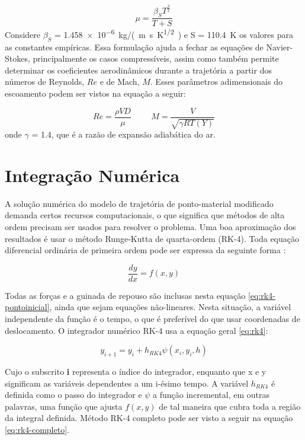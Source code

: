 \begin{equation}
\label{eq:sutherICAO}
\mu = \frac{\beta_{S}T^{\frac{3}{2}}}{T + S}
\end{equation}
%
Considere \(\beta_{S}\) = \qty{1,458e-6}{kg/(m.s.K^{1/2})} e S = \qty{110,4}{\kelvin} os valores para as constantes empíricas. Essa formulação ajuda a fechar as equações de Navier-Stokes, principalmente os casos compressíveis, assim como também permite determinar os coeficientes aerodinâmicos durante a trajetória a partir dos números de Reynolds, \(Re\) e de Mach, \(M\). Esses parâmetros adimensionais do escoamento podem ser vistos na equação a seguir:

\begin{equation}
    Re = \frac{\rho V D}{\mu} \hspace{1cm}
    M = \frac{V}{\sqrt{\gamma RT(Y)}}
\end{equation}
%
onde \(\gamma\) = \num{1,4}, que é a razão de expansão adiabática do ar.

\section{Integração Numérica}
\label{sec:numint}

A solução numérica do modelo de trajetória de ponto-material modificado demanda certos recursos computacionais, o que significa que métodos de alta ordem precisam ser usados para resolver o problema. Uma boa aproximação dos resultados é usar o método Runge-Kutta de quarta-ordem (RK-4). Toda equação diferencial ordinária de primeira ordem pode ser expressa da seguinte forma \cite{ruggiero1996calculo}:

\begin{equation}
    \label{eq:rk4-pontoinicial}
    \frac{dy}{dx} = f(x,y)
\end{equation}

Todas as forças e a guinada de repouso são inclusas nesta equação \ref{eq:rk4-pontoinicial}, ainda que sejam equações não-lineares. Nesta situação, a variável independente da função é o tempo, o que é preferível do que usar coordenadas de deslocamento. O integrador numérico RK-4 usa a equação geral \ref{eq:rk4}:

\begin{equation}
    \label{eq:rk4}
    y_{i+1} = y_{i} + h_{RK4}\psi(x_{i},y_{i},h)
\end{equation}

Cujo o subscrito \textbf{i} representa o índice do integrador, enquanto que x e y significam as variáveis dependentes a um i-ésimo tempo. A variável \(h_{RK4}\) é definida como o passo do integrador e \(\psi\) a função incremental, em outras palavras, uma função que ajusta \(f(x,y)\) de tal maneira que cubra toda a região da integral definida. Método RK-4 completo pode ser visto a seguir na equação \ref{eq:rk4-completo}.

